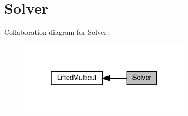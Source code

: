 \hypertarget{group__group__lifted__multicut__solver}{}\section{Solver}
\label{group__group__lifted__multicut__solver}
Collaboration diagram for Solver\+:
\nopagebreak
\begin{figure}[H]
\begin{center}
\leavevmode
\includegraphics[width=235pt]{group__group__lifted__multicut__solver}
\end{center}
\end{figure}
